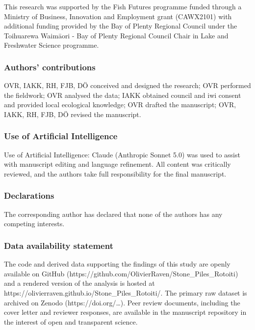 \documentclass[
  letterpaper,
  DIV=11,
  numbers=noendperiod]{scrartcl}
\newcounter{none} %
\begin{document}
This research was supported by the Fish Futures programme funded through
a Ministry of Business, Innovation and Employment grant (CAWX2101) with
additional funding provided by the Bay of Plenty Regional Council under
the Toihuarewa Waimāori - Bay of Plenty Regional Council Chair in Lake
and Freshwater Science programme.

\subsubsection{Authors' contributions}\label{authors-contributions}

OVR, IAKK, RH, FJB, DÖ conceived and designed the research; OVR
performed the fieldwork; OVR analysed the data; IAKK obtained council
and iwi consent and provided local ecological knowledge; OVR drafted the
manuscript; OVR, IAKK, RH, FJB, DÖ revised the manuscript.

\subsubsection{Use of Artificial
Intelligence}\label{use-of-artificial-intelligence}

Use of Artificial Intelligence: Claude (Anthropic Sonnet 5.0) was used
to assist with manuscript editing and language refinement. All content
was critically reviewed, and the authors take full responsibility for
the final manuscript.

\subsubsection{Declarations}\label{declarations}

The corresponding author has declared that none of the authors has any
competing interests.

\subsubsection{Data availability
statement}\label{data-availability-statement}

The code and derived data supporting the findings of this study are
openly available on GitHub
(https://github.com/OlivierRaven/Stone\_Piles\_Rotoiti) and a rendered
version of the analysis is hosted at
https://olivierraven.github.io/Stone\_Piles\_Rotoiti/. The primary raw
dataset is archived on Zenodo (https://doi.org/\ldots). Peer review
documents, including the cover letter and reviewer responses, are
available in the manuscript repository in the interest of open and
transparent science.
\end{document}

